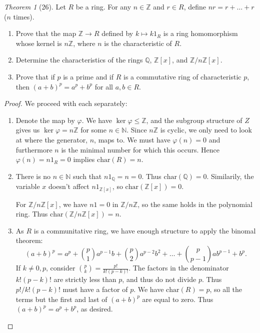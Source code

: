 \documentclass[12pt]{article}
\theoremstyle{remark}
\theoremstyle{named}
\newtheorem*{theorem}{Theorem}
\newcommand{\Z}{\mathbb Z}
\begin{document}
\begin{theorem}[26]
    Let \(R\) be a ring. For any \(n \in \Z\) and \(r \in R\), define \(nr = r + \dots + r\) (\(n\) times).
    \begin{enumerate}
        \item Prove that the map \(\Z \to R\) defined by \(k \mapsto k1_R\) is a ring homomorphism whose kernel is \(n \Z\), where \(n\) is the characteristic of \(R\). 
        \item Determine the characteristics of the rings \(\mathbb Q\), \(\Z[x]\), and \(\Z / n \Z [x]\).
        \item Prove that if \(p\) is a prime and if \(R\) is a commutative ring of characteristic \(p\), then \((a + b)^p = a^p + b^p\) for all \(a, b \in R\). 
    \end{enumerate}
\end{theorem}

\begin{proof}
    We proceed with each separately:
    \begin{enumerate}
        \item Denote the map by \(\varphi\). We have \(\ker \varphi \le \Z\), and the subgroup structure of \(Z\) gives us \(\ker \varphi = n \Z\) for some \(n \in \mathbb N\). Since \(n \Z\) is cyclic, we only need to look at where the generator, \(n\), maps to. We must have \(\varphi(n) = 0\) and furthermore \(n\) is the minimal number for which this occurs. Hence \(\varphi(n) = n1_R = 0\) implies \(\text{char}(R) = n\).
        \item There is no \(n \in \mathbb N\) such that \(n1_{\mathbb Q} = n = 0\). Thus \(\text{char}(\mathbb Q) = 0\). Similarily, the variable \(x\) doesn't affect \(n1_{\Z[x]}\), so \(\text{char}(\Z[x]) = 0\).
        
        For \(\Z / n \Z [x]\), we have \(n1 = 0\) in \(\Z / n\Z\), so the same holds in the polynomial ring. Thus \(\text{char}(\Z / n \Z[x]) = n\).

        \item As \(R\) is a communitative ring, we have enough structure to apply the binomal theorem:
        \[(a + b)^p = a^p + \binom{p}{1}a^{p - 1}b + \binom{p}{2}a^{p - 2}b^2 + \dots + \binom{p}{p - 1}ab^{p - 1} + b^p.\] 
        If \(k \neq 0, p\), consider \(\binom{p}{k} = \frac{p!}{k!(p - k)!}\). The factors in the denominator \(k!(p - k)!\) are strictly less than \(p\), and thus do not divide \(p\). Thus \(p! / k!(p - k)!\) must have a factor of \(p\). We have \(\text{char}(R) = p\), so all the terms but the first and last of \((a + b)^p\) are equal to zero. Thus \((a + b)^p = a^p + b^p\), as desired.
    \end{enumerate}
\end{proof}
\end{document}
